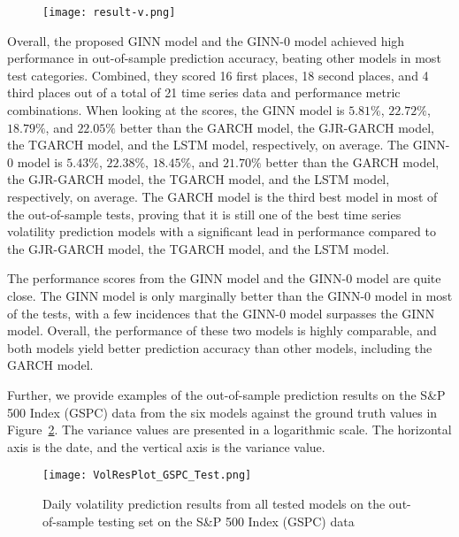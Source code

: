 \begin{comment}
\begin{figure*}
  \captionof{table}{Performance Results of Models in the Out-of-Sample Testing Dataset}
  \centering
  \texttt{[image: result-h.png]}
  \label{bigoldtable}
\end{figure*}
\end{comment}

\begin{figure}
  \centering
  \texttt{[image: result-v.png]}
  \label{bigoldtable}
\end{figure}

Overall, the proposed GINN model and the GINN-0 model achieved high performance in out-of-sample prediction accuracy, beating other models in most test categories. Combined, they scored 16 first places, 18 second places, and 4 third places out of a total of 21 time series data and performance metric combinations. When looking at the scores, the GINN model is $5.81\%$, $22.72\%$, $18.79\%$, and $22.05\%$ better than the GARCH model, the GJR-GARCH model, the TGARCH model, and the LSTM model, respectively, on average. The GINN-0 model is $5.43\%$, $22.38\%$, $18.45\%$, and $21.70\%$ better than the GARCH model, the GJR-GARCH model, the TGARCH model, and the LSTM model, respectively, on average. The GARCH model is the third best model in most of the out-of-sample tests, proving that it is still one of the best time series volatility prediction models with a significant lead in performance compared to the GJR-GARCH model, the TGARCH model, and the LSTM model. 

The performance scores from the GINN model and the GINN-0 model are quite close. The GINN model is only marginally better than the GINN-0 model in most of the tests, with a few incidences that the GINN-0 model surpasses the GINN model. Overall, the performance of these two models is highly comparable, and both models yield better prediction accuracy than other models, including the GARCH model. 

Further, we provide examples of the out-of-sample prediction results on the S\&P 500 Index (GSPC) data from the six models against the ground truth values in Figure~\ref{GPSC}. The variance values are presented in a logarithmic scale. The horizontal axis is the date, and the vertical axis is the variance value. 

\begin{figure}[h]
  \centering
  \texttt{[image: VolResPlot\_GSPC\_Test.png]}
  \caption{Daily volatility prediction results from all tested models on the out-of-sample testing set on the S\&P 500 Index (GSPC) data}
  \label{GPSC}
\end{figure}

